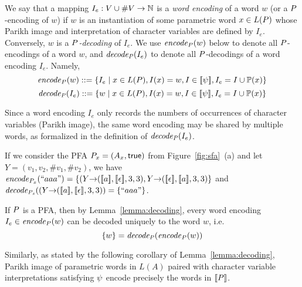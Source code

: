 \documentclass[sigplan,review,anonymous]{acmart}\settopmatter{printfolios=true,printccs=false,printacmref=false}
\begin{document}
We say that a mapping $I_e:V\cup\#V \rightarrow \mathbb{N}$ is a \emph{word encoding} of a word $w$  (or a $P$-encoding of $w$) if $w$ is an instantiation of some parametric word $x \in L(P)$ whose Parikh image and interpretation of character variables are defined by $I_e$.  
%
Conversely, $w$ is a \emph{$P$-decoding} of $I_e$.
%
We use $\mathit{encode}_{P}(w)$ below to denote all $P$-encodings of a word $w$,
and $\mathit{decode_{P}} (I_e)$ to denote all $P$-decodings of a word encoding $I_e$. Namely,  
	$$\mathit{encode}_{P}( w ) ::= \{I_e \mid  x \in L(P) , I(x) =w, I\in[\![\psi]\!], I_e = I \cup \mathbb{P}{(x)}\}$$
	$$\mathit{decode_{P}}(I_e) ::=\{ w \mid x \in L(P) , I(x) =w, I\in[\![\psi]\!], I_e = I \cup \mathbb{P}{(x)} \}$$

Since a word encoding $I_e$ only records the numbers of occurrences of character variables (Parikh image), 
the same word encoding may be shared by multiple words, as formalized in the definition of $\mathit{decode_{P}}(I_e)$. 

\begin{example}
If we consider the PFA ${P_x}=(A_x,\mbox{$\mathsf{true}$})$ from Figure~\ref{fig:sfa}~(a) and let $Y{=}(v_1,v_2,\#v_1,\#v_2)$, we have\\
$\encode {\pa_x}( ``aaa" ) =\{ (Y{\rightarrow}(\semof{a},\semof{\epsilon},3,3), Y{\rightarrow}(\semof{\epsilon},\semof{a},3,3)  \}$ and
$\mathit{decode_{P_x}}((Y{\rightarrow}([\![a]\!],[\![\epsilon]\!],3,3))=\{``aaa"\} $.
\end{example}

If $P$ is a PFA, then by Lemma~\ref{lemma:decoding}, every word encoding $I_e\in \mathit{encode}_{P}( w )$ can be decoded uniquely to the word $w$, i.e.
$$
\{w\} = \mathit{decode_{P}} (\mathit{encode}_{P} (w))
$$

Similarly, as stated by the following corollary of Lemma~\ref{lemma:decoding}, 
Parikh image of parametric words in $L(A)$ paired with character variable interpretations satisfying $\psi$ encode precisely the words in $[\![P]\!]$.
\end{document}
